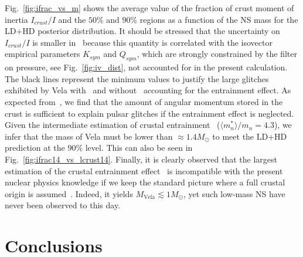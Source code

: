 Fig.~\ref{fig:ifrac_vs_m} shows the average value of the fraction of crust 
moment of inertia $I_{crust}/I$ and the $50\%$ and $90\%$ regions 
as a function of the NS mass for the LD+HD posterior distribution. It should be
stressed that the uncertainty on $I_{crust}/I$ is smaller 
in~\cite{Carreau2019moi} because this quantity is correlated with the 
isovector empirical parameters $K_{sym}$ and $Q_{sym}$, which are strongly
constrained by the filter on pressure, see Fig.~\ref{fig:iv_dist}, not
accounted for in the present calculation. The black
lines represent the minimum values to justify the large glitches exhibited by
Vela with~\cite{Delsate2016,Andersson2012} and without~\cite{Link1999} 
accounting for the entrainment effect. As expected from~\cite{Link1999}, we
find that the amount of angular momentum stored in the crust is sufficient to
explain pulsar glitches if the entrainment effect is neglected.
Given the intermediate estimation of crustal entrainment~\cite{Andersson2012}
($\langle m_n^*\rangle/m_n = 4.3$), we infer that the mass of Vela must be
lower than $\approx 1.4M_\odot$ to meet the LD+HD prediction at the $90\%$
level. This can also be seen in Fig.~\ref{fig:ifrac14_vs_lcrust14}.
Finally, it is clearly observed that the largest estimation of the crustal 
entrainment effect~\cite{Delsate2016} is incompatible with the present nuclear 
physics knowledge if we keep the standard picture where a full crustal origin 
is assumed~\cite{Anderson1975}. Indeed, it yields $M_\text{Vela} \lesssim 
1M_\odot$, yet such low-mass NS have never been observed to this day.

\section{Conclusions}\label{sec:conclu2}

